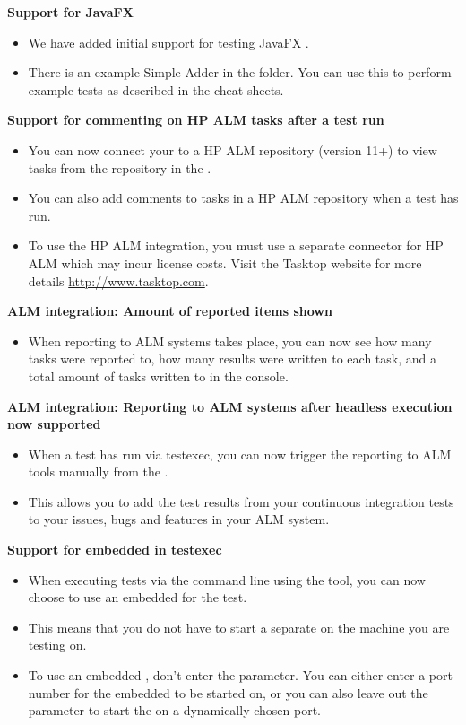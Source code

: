 \textbf{Support for JavaFX \gdauts{}}
\begin{itemize}
\item We have added initial support for testing JavaFX \gdauts{}. 
\item There is an example Simple Adder \gdaut{} in the  folder. You can use this to perform example tests as described in the cheat sheets.
\end{itemize}

\textbf{Support for commenting on HP ALM tasks after a test run}
\begin{itemize}
\item You can now connect your \ite{} to a HP ALM repository (version 11+) to view tasks from the repository in the \ite{}.
\item You can also add comments to tasks in a HP ALM repository when a test has run.
\item To use the HP ALM integration, you must use a separate connector for HP ALM which may incur license costs. Visit the Tasktop website for more details \url{http://www.tasktop.com}.
\end{itemize} 

\textbf{ALM integration: Amount of reported items shown}
\begin{itemize}
\item When reporting to ALM systems takes place, you can now see how many tasks were reported to, how many results were written to each task, and a total amount of tasks written to in the console.
\end{itemize}

\textbf{ALM integration: Reporting to ALM systems after headless execution now supported}
\begin{itemize}
\item When a test has run via testexec, you can now trigger the reporting to ALM tools manually from the \gdtestsummaryview{}. 
\item This allows you to add the test results from your continuous integration tests to your issues, bugs and features in your ALM system. 
\end{itemize}

\textbf{Support for embedded \gdagent{} in testexec}
\begin{itemize}
\item When executing tests via the command line using the  tool, you can now choose to use an embedded \gdagent{} for the test.
\item This means that you do not have to start a separate \gdagent{} on the machine you are testing on.
\item To use an embedded \gdagent{}, don't enter the  parameter. You can either enter a port number for the embedded \gdagent{} to be started on, or you can also leave out the  parameter to start the \gdagent{} on a dynamically chosen port.
\end{itemize}

